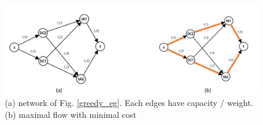 \begin{figure}[htb]
\includegraphics[width=1\textwidth]{figure/fig-network_greedy.pdf}
\centering
\caption{(a) network of Fig. \ref{greedy_eg}.  Each edges have capacity / weight. (b) maximal flow with minimal cost} \label{fig-network_greedy}
\end{figure}